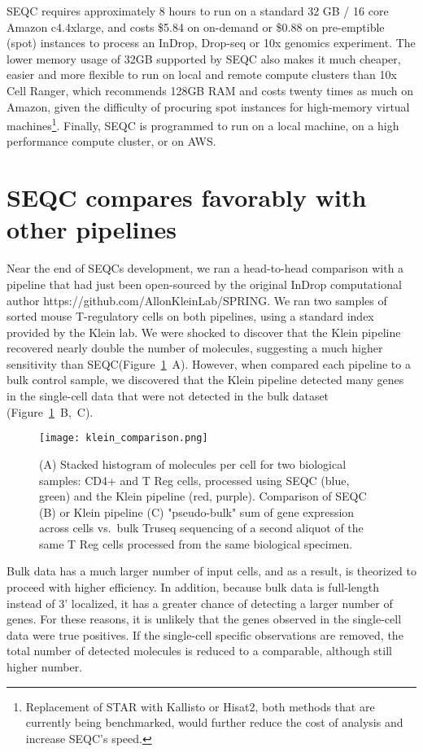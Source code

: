 SEQC requires approximately 8 hours to run on a standard 32 GB / 16 core Amazon c4.4xlarge, and costs \$5.84 on on-demand or \$0.88 on pre-emptible (spot) instances to process an InDrop, Drop-seq or 10x genomics experiment.
The lower memory usage of 32GB supported by SEQC also makes it much cheaper, easier and more flexible to run on local and remote compute clusters than 10x Cell Ranger, which recommends 128GB RAM and costs twenty times as much on Amazon, given the difficulty of procuring spot instances for high-memory virtual machines\footnote{Replacement of STAR with Kallisto or Hisat2, both methods that are currently being benchmarked, would further reduce the cost of analysis and increase SEQC's speed.}. 
Finally, SEQC is programmed to run on a local machine, on a high performance compute cluster, or on AWS. 

\section{SEQC compares favorably with other pipelines}

Near the end of SEQCs development, we ran a head-to-head comparison with a pipeline that had just been open-sourced by the original InDrop computational author {\mono https://github.com/AllonKleinLab/SPRING}. 
We ran two samples of sorted mouse T-regulatory cells on both pipelines, using a standard index provided by the Klein lab. 
We were shocked to discover that the Klein pipeline recovered nearly double the number of molecules, suggesting a much higher sensitivity than SEQC\@ (Figure~\ref{fig:klein}~A).
However, when compared each pipeline to a bulk control sample, we discovered that the Klein pipeline detected many genes in the single-cell data that were not detected in the bulk dataset (Figure~\ref{fig:klein}~B,~C). 

\begin{figure}
\centering
\texttt{[image: klein\_comparison.png]}
\caption{(A) Stacked histogram of molecules per cell for two biological samples: CD4+ and T Reg cells, processed using SEQC (blue, green) and the Klein pipeline (red, purple).
Comparison of SEQC (B) or Klein pipeline (C) "pseudo-bulk" sum of gene expression across cells vs.\ bulk Truseq sequencing of a second aliquot of the same T Reg cells processed from the same biological specimen.}
\label{fig:klein}
\end{figure}

Bulk data has a much larger number of input cells, and as a result, is theorized to proceed with higher efficiency. 
In addition, because bulk data is full-length instead of 3' localized, it has a greater chance of detecting a larger number of genes. 
For these reasons, it is unlikely that the genes observed in the single-cell data were true positives.
If the single-cell specific observations are removed, the total number of detected molecules is reduced to a comparable, although still higher number. 

